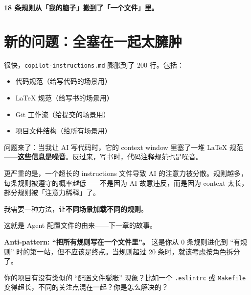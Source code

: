\textbf{18 条规则从「我的脑子」搬到了「一个文件」里。}

\section{新的问题：全塞在一起太臃肿}

很快，\texttt{copilot-instructions.md} 膨胀到了 200 行。包括：

\begin{itemize}
  \item 代码规范（给写代码的场景用）
  \item LaTeX 规范（给写书的场景用）
  \item Git 工作流（给提交的场景用）
  \item 项目文件结构（给所有场景用）
\end{itemize}

问题来了：当我让 AI 写代码时，它的 context window 里塞了一堆 LaTeX 规范——\textbf{这些信息是噪音}。反过来，写书时，代码注释规范也是噪音。

更严重的是，一个超长的 instructions 文件导致 AI 的注意力被分散。规则越多，每条规则被遵守的概率越低——不是因为 AI 故意违反，而是因为 context 太长，部分规则被「注意力稀释」了。

我需要一种方法，让\textbf{不同场景加载不同的规则}。

这就是 Agent 配置文件的由来——下一章的故事。

\begin{pitfallbox}
\textbf{Anti-pattern: ``把所有规则写在一个文件里''。} 这是你从 0 条规则进化到 ``有规则'' 时的第一站，但不应该是终点。当规则超过 20 条时，就该考虑按角色拆分了。
\end{pitfallbox}

\begin{thinkbox}
你的项目有没有类似的 ``配置文件膨胀'' 现象？比如一个 \texttt{.eslintrc} 或 \texttt{Makefile} 变得超长，不同的关注点混在一起？你是怎么解决的？
\end{thinkbox}
